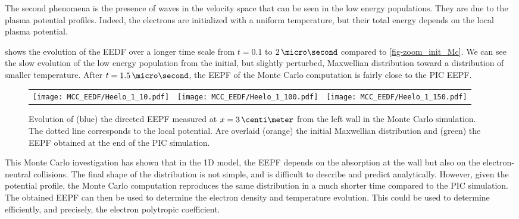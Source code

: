     The second phenomena is the presence of waves in the velocity space that can be seen in the low energy populations.
    They are due to the plasma potential profiles.
    Indeed, the electrons are initialized with a uniform temperature, but their total energy depends on the local plasma potential. 

     shows the evolution of the EEDF over a longer time scale from $t=0.1$ to $2\,\micro\second$ compared to \cref{fig-zoom_init_Mc}.
    We can see the slow evolution of the low energy population from the initial, but slightly perturbed, Maxwellian distribution toward a distribution of smaller temperature.
    After $t=1.5\,\micro\second$, the EEPF of the Monte Carlo computation is fairly close to the \ac{PIC} EEPF.

    \begin{figure}[!hbt]
      \begin{tabular}{@{} ccc}
        \texttt{[image: MCC\_EEDF/Heelo\_1\_10.pdf]} &
        \texttt{[image: MCC\_EEDF/Heelo\_1\_100.pdf]} &
        \texttt{[image: MCC\_EEDF/Heelo\_1\_150.pdf]} \\
      \end{tabular}
      \caption{Evolution of (blue) the directed EEPF measured at $x=3\,\centi\meter$ from the left wall in the Monte Carlo simulation. The dotted line corresponds to the local potential. Are overlaid (orange) the initial Maxwellian distribution and (green) the EEPF obtained at the end of the \acs{PIC} simulation. }
      \label{fig-zoom_Mc_later}
    \end{figure}

    \vspace{1em}
    This Monte Carlo investigation has shown that in the \ac{1D} model, the EEPF depends on the absorption at the wall but also on the electron-neutral collisions.
    The final shape of the distribution is not simple, and is difficult to describe and predict analytically.
    However, given the potential profile, the Monte Carlo computation reproduces the same distribution in a much shorter time compared to the \ac{PIC} simulation. 
    The obtained EEPF can then be used to determine the electron density and temperature evolution.
    This could be used to determine efficiently, and precisely, the electron polytropic coefficient.

